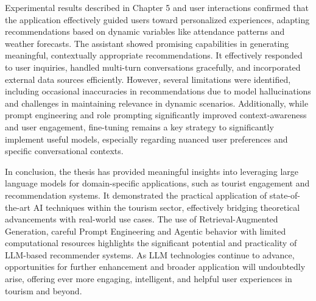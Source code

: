 Experimental results described in Chapter 5 and user interactions confirmed that the application effectively guided users toward personalized experiences, adapting recommendations based on dynamic variables like attendance patterns and weather forecasts. The assistant showed promising capabilities in generating meaningful, contextually appropriate recommendations. It effectively responded to user inquiries, handled multi-turn conversations gracefully, and incorporated external data sources efficiently. However, several limitations were identified, including occasional inaccuracies in recommendations due to model hallucinations and challenges in maintaining relevance in dynamic scenarios. Additionally, while prompt engineering and role prompting significantly improved context-awareness and user engagement, fine-tuning remains a key strategy to significantly implement useful models, especially regarding nuanced user preferences and specific conversational contexts.

In conclusion, the thesis has provided meaningful insights into leveraging large language models for domain-specific applications, such as tourist engagement and recommendation systems. It demonstrated the practical application of state-of-the-art AI techniques within the tourism sector, effectively bridging theoretical advancements with real-world use cases. The use of Retrieval-Augmented Generation, careful Prompt Engineering and Agentic behavior with limited computational resources highlights the significant potential and practicality of LLM-based recommender systems. As LLM technologies continue to advance, opportunities for further enhancement and broader application will undoubtedly arise, offering ever more engaging, intelligent, and helpful user experiences in tourism and beyond.